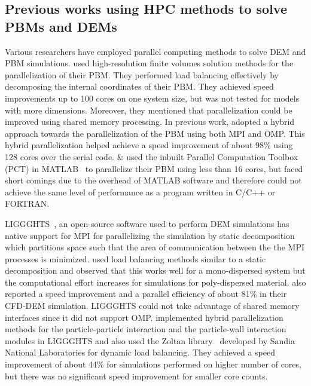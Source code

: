\documentclass[preprint,11pt,authoryear]{elsarticle}
\begin{document}
\subsection{Previous works using HPC methods to solve PBMs and DEMs}
Various researchers have employed parallel computing methods to solve DEM and PBM simulations. 
\cite{Gunawan2008} used high-resolution finite volumes solution methods for the parallelization 
of their PBM. They performed load 
balancing effectively by decomposing the internal coordinates of their PBM. They achieved 
speed improvements up to 100 cores on one system size, but was not tested for models 
with more dimensions. Moreover, they mentioned that parallelization could be 
improved using shared memory processing. 
In previous work, \cite{Bettencourt2017} adopted a 
hybrid approach towards the parallelization of the PBM using both MPI and OMP. 
This hybrid parallelization helped achieve a speed improvement of about 98\% using 
128 cores over the serial code. \cite{Prakash2013a} \& \cite{Prakash2013b} used 
the inbuilt Parallel Computation Toolbox (PCT) in MATLAB~\citep{pctMatlab} to parallelize 
their PBM using less than 16 cores, but faced short comings due to the overhead 
of MATLAB software and therefore could not achieve the same level of performance 
as a program written in C/C++ or FORTRAN.  

LIGGGHTS~\citep{Kloss2012}, an open-source software used to perform DEM simulations has native 
support for MPI for parallelizing the simulation by static decomposition which partitions space such that 
the area of communication between the the MPI processes is minimized. \cite{kacianauskas2010} used 
load balancing methods similar to a static decomposition and observed that this works well for a 
mono-dispersed system but the computational effort increases for simulations for poly-dispersed 
material. \cite{Gopalakrishnan2013} also reported a speed improvement and a parallel efficiency of about 
81\% in their CFD-DEM simulation. LIGGGHTS could not take advantage of shared memory interfaces 
since it did not support OMP. \cite{Berger2015} implemented hybrid parallelization methods for the 
particle-particle interaction and the particle-wall interaction modules in LIGGGHTS and also used the 
Zoltan library~\citep{Boman2012} developed by Sandia National Laboratories for dynamic load 
balancing. They achieved a speed improvement of about 44\% for simulations performed on higher 
number of cores, but there was no significant speed improvement for smaller core counts. 
\end{document}
